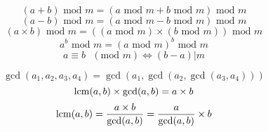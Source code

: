 $$ (a + b) \text{ mod } m = (a \text{ mod } m + b \text{ mod } m) \text{ mod } m $$
$$ (a - b) \text{ mod } m = (a \text{ mod } m - b \text{ mod } m) \text{ mod } m $$
$$ (a \times b) \text{ mod } m = ((a \text{ mod } m) \times (b \text{ mod } m)) \text{ mod } m $$
$$ a^b \text{ mod } m = (a \text{ mod } m)^b \text{ mod } m $$
$$ a \equiv b \text{ } (\text{mod } m) \iff (b - a) \vert m $$

$$ \gcd(a_1, a_2, a_3, a_4) = \gcd(a_1, \gcd(a_2, \gcd(a_3, a_4))) $$
$$ \mathrm{lcm}(a, b) \times \gcd(a, b) = a \times b $$
$$ \mathrm{lcm}(a, b) = \dfrac{a \times b}{\gcd(a, b)} = \dfrac{a}{\gcd(a,b)} \times b $$